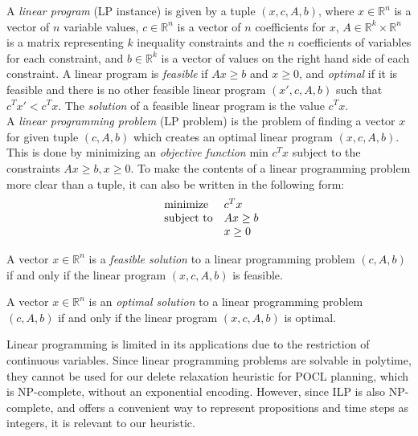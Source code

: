 A \textit{linear program} (LP instance) is given by a tuple $(x,c,A,b)$, where $x\in \mathbb{R}^n$ is a vector of $n$ variable values, $c\in \mathbb{R}^n$ is a vector of $n$ coefficients for $x$, $A\in\mathbb{R}^k\times\mathbb{R}^n$ is a matrix representing $k$ inequality constraints and the $n$ coefficients of variables for each constraint, and $b\in \mathbb{R}^k$ is a vector of values on the right hand side of each constraint. A linear program is \textit{feasible} if $Ax\geq b$ and $x\geq 0$, and \textit{optimal} if it is feasible and there is no other feasible linear program $(x',c,A,b)$ such that $c^Tx'<c^Tx$. The \textit{solution} of a feasible linear program is the value  $c^Tx$.\\

A \textit{linear programming problem} (LP problem) is the problem of finding a vector $x$ for given tuple $(c,A,b)$ which creates an optimal linear program $(x,c,A,b)$. This is done by minimizing an \textit{objective function} $\text{min } c^Tx$ subject to the constraints $Ax\geq b,x\geq 0$. To make the contents of a linear programming problem more clear than a tuple, it can also be written in the following form:
\begin{equation*}
  \begin{array}{ll@{}ll}
    \text{minimize}   & c^Tx\\
    \text{subject to} & Ax\geq b\\
                      & x\geq 0
  \end{array}
\end{equation*}

\begin{definition}
    A vector $x\in \mathbb{R}^n$ is a \textit{feasible solution} to a linear programming problem $(c,A,b)$ if and only if the linear program $(x,c,A,b)$ is feasible.
\end{definition}

\begin{definition}
    A vector $x\in \mathbb{R}^n$ is an \textit{optimal solution} to a linear programming problem $(c,A,b)$ if and only if the linear program $(x,c,A,b)$ is optimal.
\end{definition}

Linear programming is limited in its applications due to the restriction of continuous variables. Since linear programming problems are solvable in polytime, they cannot be used for our delete relaxation heuristic for POCL planning, which is NP-complete, without an exponential encoding. However, since ILP is also NP-complete, and offers a convenient way to represent propositions and time steps as integers, it is relevant to our heuristic.\\

